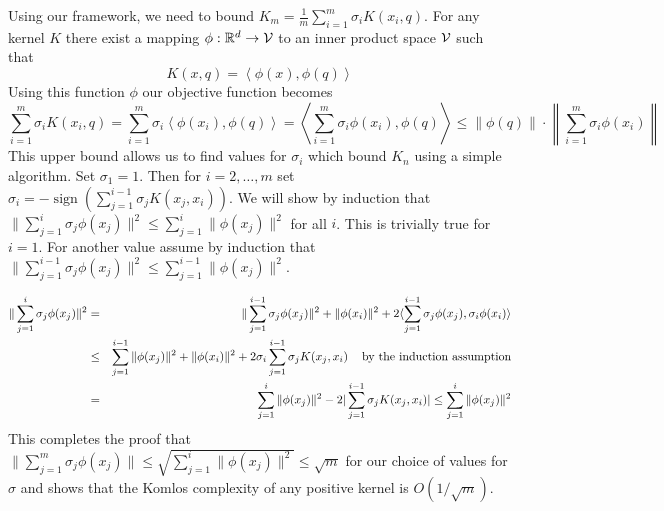 \documentclass[anon,12pt]{colt2019} %
\newcommand{\ip}[1]{\left \langle #1 \right \rangle}
\newcommand{\R}{\mathbb{R}}
\begin{document}
Using our framework, we need to bound $K_m = \frac{1}{m}\sum_{i=1}^m \sigma_i K(x_i,q)$. For any kernel $K$ there exist a mapping $\phi: \R^d \to {\cal V}$ to an inner product space $\cal V$ such that 
$$ K(x,q) = \ip{\phi(x), \phi(q)} $$
Using this function $\phi$ our objective function becomes
\[
\sum_{i=1}^m \sigma_i K(x_i,q) = \sum_{i=1}^m \sigma_i \ip{\phi(x_i), \phi(q)} =  \ip{ \sum_{i=1}^m \sigma_i \phi(x_i), \phi(q)} \leq  \|\phi(q)\| \cdot \left\|  \sum_{i=1}^m \sigma_i \phi(x_i) \right\| %
\]
This upper bound allows us to find values for $\sigma_i$ which bound $K_n$ using a simple algorithm.
Set $\sigma_1 = 1$. Then for $i=2,\ldots,m$ set $\sigma_i = -\operatorname{sign} (\sum_{j=1}^{i-1}\sigma_j  K(x_j, x_i))$.
We will show by induction that $\| \sum_{j=1}^i \sigma_j \phi(x_j) \|^2 \le \sum_{j=1}^i \|\phi(x_j)\|^2$ for all $i$.
This is trivially true for $i=1$. 
For another value assume by induction that $\| \sum_{j=1}^{i-1} \sigma_j \phi(x_j)\|^2 \le \sum_{j=1}^{i-1} \|\phi(x_j)\|^2$.

\begin{eqnarray*}
\| \sum_{j=1}^{i}\sigma_j \phi(x_j)\|^2 &=& \|\sum_{j=1}^{i-1}\sigma_j \phi(x_j)\|^2 + \|\phi(x_i)\|^2 + 2\langle \sum_{j=1}^{i-1}\sigma_j \phi(x_j), \sigma_i \phi(x_i)\rangle \\
&\le& \sum_{j=1}^{i-1} \|\phi(x_j)\|^2 + \|\phi(x_i)\|^2 + 2\sigma_i \sum_{j=1}^{i-1}\sigma_j K(x_j, x_i) \mbox{\;\;\; by the induction assumption}\\ 
&=& \sum_{j=1}^{i} \|\phi(x_j)\|^2 - 2|\sum_{j=1}^{i-1}\sigma_j K(x_j, x_i)| \le \sum_{j=1}^{i} \|\phi(x_j)\|^2
\end{eqnarray*}
This completes the proof that $\| \sum_{j=1}^{m}\sigma_j \phi(x_j)\| \le \sqrt{\sum_{j=1}^{i} \|\phi(x_j)\|^2} \le \sqrt{m}$ for our choice of values for $\sigma$ and shows that the Komlos complexity of any positive kernel is $O(1/\sqrt{m})$. 
%
\end{document}

